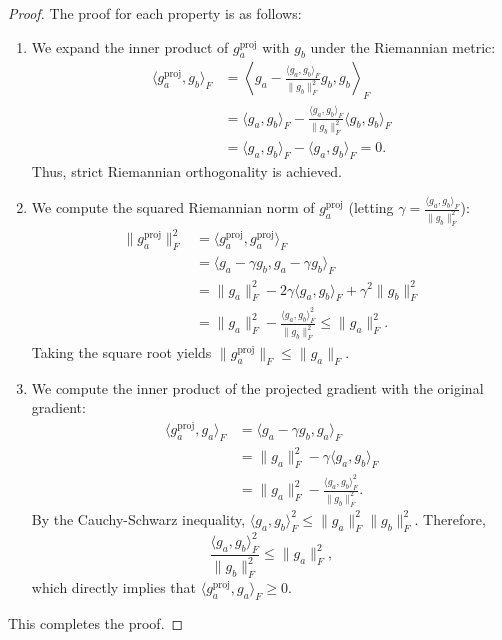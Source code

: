 \documentclass{article}
\theoremstyle{plain}
\theoremstyle{definition}
\theoremstyle{remark}
\begin{document}
\begin{proof}
The proof for each property is as follows:
\begin{enumerate}
    \item We expand the inner product of $g_a^{\text{proj}}$ with $g_b$ under the Riemannian metric:
    \begin{align*}
    \langle g_a^{\text{proj}}, g_b \rangle_F &= \left\langle g_a - \frac{\langle g_a, g_b \rangle_F}{\|g_b\|_F^2} g_b, g_b \right\rangle_F \\
    &= \langle g_a, g_b \rangle_F - \frac{\langle g_a, g_b \rangle_F}{\|g_b\|_F^2} \langle g_b, g_b \rangle_F \\
    &= \langle g_a, g_b \rangle_F - \langle g_a, g_b \rangle_F = 0.
    \end{align*}
    Thus, strict Riemannian orthogonality is achieved.
    \item We compute the squared Riemannian norm of $g_a^{\text{proj}}$ (letting $\gamma = \frac{\langle g_a, g_b \rangle_F}{\|g_b\|_F^2}$):
    \begin{align*}
    \|g_a^{\text{proj}}\|_F^2 &= \langle g_a^{\text{proj}}, g_a^{\text{proj}} \rangle_F \\
    &= \langle g_a - \gamma g_b, g_a - \gamma g_b \rangle_F \\
    &= \|g_a\|_F^2 - 2 \gamma \langle g_a, g_b \rangle_F + \gamma^2 \|g_b\|_F^2 \\
    &= \|g_a\|_F^2 - \frac{\langle g_a, g_b \rangle_F^2}{\|g_b\|_F^2} \leq \|g_a\|_F^2.
    \end{align*}
    Taking the square root yields $\|g_a^{\text{proj}}\|_F \leq \|g_a\|_F$.
    \item We compute the inner product of the projected gradient with the original gradient:
    \begin{align*}
    \langle g_a^{\text{proj}}, g_a \rangle_F &= \langle g_a - \gamma g_b, g_a \rangle_F \\
    &= \|g_a\|_F^2 - \gamma \langle g_a, g_b \rangle_F \\
    &= \|g_a\|_F^2 - \frac{\langle g_a, g_b \rangle_F^2}{\|g_b\|_F^2}.
    \end{align*}
    By the Cauchy-Schwarz inequality, $\langle g_a, g_b \rangle_F^2 \leq \|g_a\|_F^2 \|g_b\|_F^2$. Therefore,
    \[
    \frac{\langle g_a, g_b \rangle_F^2}{\|g_b\|_F^2} \leq \|g_a\|_F^2,
    \]
    which directly implies that $\langle g_a^{\text{proj}}, g_a \rangle_F \geq 0$.
\end{enumerate}
This completes the proof.
\end{proof}
\end{document}
